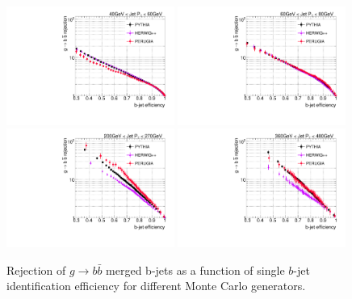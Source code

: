 


\begin{figure}[tp]
\centering
\includegraphics[width=0.49\textwidth]{FIGS/systematics/newInterpLlhoodKDE_ISO_DiffMCGen_rejvseff040.pdf}
\includegraphics[width=0.49\textwidth]{FIGS/systematics/newInterpLlhoodKDE_ISO_DiffMCGen_rejvseff060.pdf}
\includegraphics[width=0.49\textwidth]{FIGS/systematics/newInterpLlhoodKDE_ISO_DiffMCGen_rejvseff200.pdf}
\includegraphics[width=0.49\textwidth]{FIGS/systematics/newInterpLlhoodKDE_ISO_DiffMCGen_rejvseff360.pdf}
\caption{Rejection of $g\rightarrow b \bar{b}$ merged b-jets as a function of single $b$-jet identification efficiency for different Monte Carlo generators.}
\label{fig:performanceotherMC}
\end{figure}

